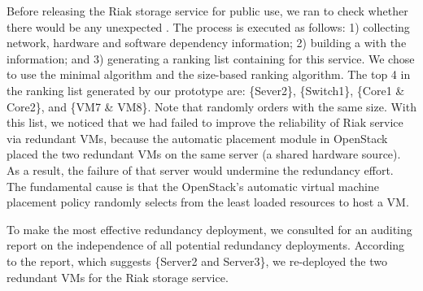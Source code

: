 Before releasing the Riak storage service for public use,
we ran \sia to check whether there would be any unexpected \rgs.
The \sia process is executed as follows:
1) collecting network,
hardware and software dependency information;
2) building a \ft with the information; and
3) generating a ranking list containing \rgs for this service.
We chose to use the minimal \rg algorithm and
the size-based ranking algorithm.
The top 4 \rgs in the \rg ranking list generated by our prototype are:
\{Sever2\}, \{Switch1\},
\{Core1 \& Core2\}, and \{VM7 \& VM8\}.
Note that \sia randomly orders \rgs with the same size.
With this list, we noticed that we had failed to
improve the reliability of Riak service via redundant VMs,
because the automatic placement module in OpenStack
placed the two redundant VMs on the same server (a shared hardware source).
As a result, the failure of that
server would undermine the redundancy effort.
The fundamental cause is that the OpenStack's automatic virtual machine placement policy
randomly selects from the least loaded resources
to host a VM.

To make the most effective redundancy deployment,
we consulted \app for an auditing report on the independence
of all potential redundancy deployments.
According to the report, which suggests \{Server2 and Server3\},
we re-deployed the two redundant VMs for the Riak storage service.


\begin{table}[t]
  \caption[A \rg-ranking list for OpenStack case study.]{A \rg-ranking 
    list obtained by minimal \rg
		algorithm and size-based ranking metric.
		\sia randomly orders \rgs with the same size.}
  \label{tab-results}
\end{table}



